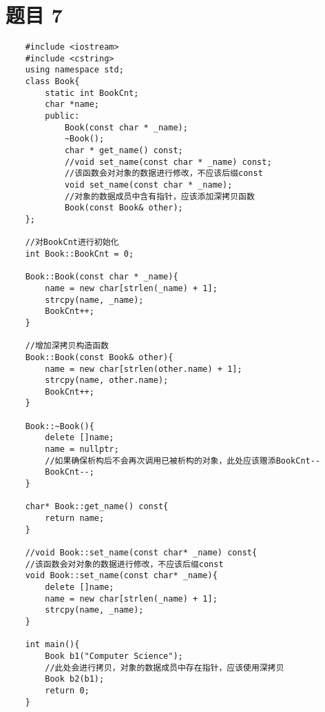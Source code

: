 \documentclass{article}
\begin{document}
\section{题目 7}
\begin{lstlisting}
    #include <iostream>
    #include <cstring>
    using namespace std;
    class Book{
        static int BookCnt;
        char *name;
        public:
            Book(const char * _name);
            ~Book();
            char * get_name() const;
            //void set_name(const char * _name) const;
            //该函数会对对象的数据进行修改，不应该后缀const
            void set_name(const char * _name);
            //对象的数据成员中含有指针，应该添加深拷贝函数
            Book(const Book& other);
    };
    
    //对BookCnt进行初始化
    int Book::BookCnt = 0;
    
    Book::Book(const char * _name){
        name = new char[strlen(_name) + 1];
        strcpy(name, _name);
        BookCnt++;
    }
    
    //增加深拷贝构造函数
    Book::Book(const Book& other){
        name = new char[strlen(other.name) + 1];
        strcpy(name, other.name);
        BookCnt++;
    }
    
    Book::~Book(){
        delete []name;
        name = nullptr;
        //如果确保析构后不会再次调用已被析构的对象，此处应该赠添BookCnt--
        BookCnt--;
    }
    
    char* Book::get_name() const{
        return name;
    }
    
    //void Book::set_name(const char* _name) const{
    //该函数会对对象的数据进行修改，不应该后缀const
    void Book::set_name(const char* _name){
        delete []name;
        name = new char[strlen(_name) + 1];
        strcpy(name, _name);
    }
    
    int main(){
        Book b1("Computer Science");
        //此处会进行拷贝，对象的数据成员中存在指针，应该使用深拷贝
        Book b2(b1);
        return 0;
    }
\end{lstlisting}
\end{document}
